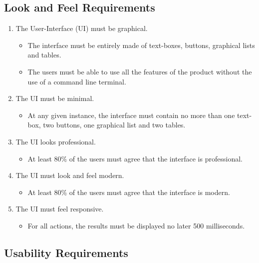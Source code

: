 \documentclass[12pt]{article}
\begin{document}
\subsection{Look and Feel Requirements}
\begin{enumerate}
    \item The User-Interface (UI) must be graphical.
    \begin{itemize}
        \item The interface must be entirely made of text-boxes, buttons, graphical lists and tables.
        \item The users must be able to use all the features of the product without the use of a command line terminal.
    \end{itemize}
    \item The UI must be minimal.
    \begin{itemize}
        \item At any given instance, the interface must contain no more than one text-box, two buttons, one graphical list and two tables.
    \end{itemize}
    \item The UI looks professional.
    \begin{itemize}
        \item At least 80\% of the users must agree that the interface is professional.
    \end{itemize}
    \item The UI must look and feel modern.
    \begin{itemize}
        \item At least 80\% of the users must agree that the interface is modern.
    \end{itemize}
    \item The UI must feel responsive.
    \begin{itemize}
        \item For all actions, the results must be displayed no later 500 milliseconds.
    \end{itemize}
\end{enumerate}

\subsection{Usability Requirements}
\end{document}
